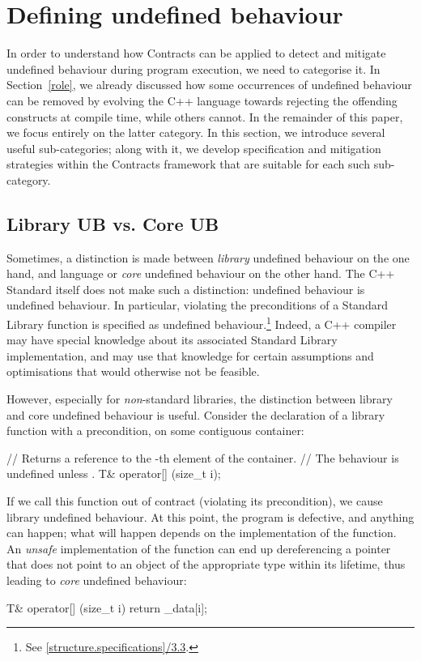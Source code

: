 \section{Defining undefined behaviour}

In order to understand how Contracts can be applied to detect and mitigate undefined behaviour during program execution, we need to categorise it. In Section~\ref{role}, we already discussed how some occurrences of undefined behaviour can be removed by evolving the C++ language towards rejecting the offending constructs at compile time, while others cannot. In the remainder of this paper, we focus entirely on the latter category. In this section, we introduce several useful sub-categories; along with it, we develop specification and mitigation strategies within the Contracts framework that are suitable for each such sub-category.
	
\subsection{Library UB vs. Core UB}

Sometimes, a distinction is made between \emph{library} undefined behaviour on the one hand, and language or \emph{core} undefined behaviour on the other hand. The C++ Standard itself does not make such a distinction: undefined behaviour is undefined behaviour. In particular, violating the preconditions of a Standard Library function is specified as undefined behaviour.\footnote{See \href{https://timsong-cpp.github.io/cppwp/n4950/library\#structure.specifications-3.3}{[structure.specifications]/3.3}.} Indeed, a C++ compiler may have special knowledge about its associated Standard Library implementation, and may use that knowledge for certain assumptions and optimisations that would otherwise not be feasible.

However, especially for \emph{non}-standard libraries, the distinction between library and core undefined behaviour is useful. Consider the declaration of a library function with a precondition,  on some contiguous container:
\begin{codeblock}
// Returns a reference to the -th element of the container.
// The behaviour is undefined unless .
T& operator[] (size_t i);
\end{codeblock}
If we call this function out of contract (violating its precondition), we cause library undefined behaviour. At this point, the program is defective, and anything can happen; what will happen depends on the implementation of the function. An \emph{unsafe} implementation of the function can end up dereferencing a pointer that does not point to an object of the appropriate type within its lifetime, thus leading to \emph{core} undefined behaviour:
\begin{codeblock}
T& operator[] (size_t i) {
  return _data[i];
}
\end{codeblock}

